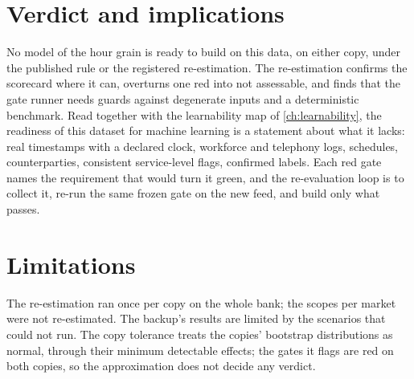 \section{Verdict and implications}\label{sec:rg-verdict}

No model of the hour grain is ready to build on this data, on either copy, under the published rule or the registered
re-estimation. The re-estimation confirms the scorecard where it can, overturns one red into not assessable, and finds that the
gate runner needs guards against degenerate inputs and a deterministic benchmark. Read together with the learnability map of
\cref{ch:learnability}, the readiness of this dataset for machine learning is a statement about what it lacks: real timestamps with a
declared clock, workforce and telephony logs, schedules, counterparties, consistent service-level flags, confirmed labels. Each red
gate names the requirement that would turn it green, and the re-evaluation loop is to collect it, re-run the same frozen gate on the
new feed, and build only what passes.

\section{Limitations}\label{sec:rg-limits}

The re-estimation ran once per copy on the whole bank; the scopes per market were not re-estimated. The backup's results are limited
by the scenarios that could not run. The copy tolerance treats the copies' bootstrap distributions as normal, through their minimum
detectable effects; the gates it flags are red on both copies, so the approximation does not decide any verdict.
